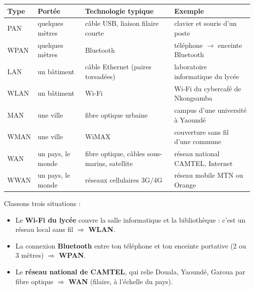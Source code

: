 \documentclass[11pt]{article}
\begin{document}
\begin{center}
\begin{tabularx}{\linewidth}{|l|l|X|X|}
\hline
\rowcolor{popblueL} \textbf{Type} & \textbf{Portée} & \textbf{Technologie typique} & \textbf{Exemple} \\
\hline
PAN & quelques mètres & câble USB, liaison filaire courte & clavier et souris d'un poste \\
\hline
WPAN & quelques mètres & Bluetooth & téléphone $\to$ enceinte Bluetooth \\
\hline
LAN & un bâtiment & câble Ethernet (paires torsadées) & laboratoire informatique du lycée \\
\hline
WLAN & un bâtiment & Wi-Fi & Wi-Fi du cybercafé de Nkongsamba \\
\hline
MAN & une ville & fibre optique urbaine & campus d'une université à Yaoundé \\
\hline
WMAN & une ville & WiMAX & couverture sans fil d'une commune \\
\hline
WAN & un pays, le monde & fibre optique, câbles sous-marins, satellite & réseau national CAMTEL, Internet \\
\hline
WWAN & un pays, le monde & réseaux cellulaires 3G/4G & réseau mobile MTN ou Orange \\
\hline
\end{tabularx}
\end{center}

\begin{exemplebox}
Classons trois situations :
\begin{itemize}
\item Le \textbf{Wi-Fi du lycée} couvre la salle informatique et la bibliothèque : c'est un réseau local sans fil $\Rightarrow$ \textbf{WLAN}.
\item La connexion \textbf{Bluetooth} entre ton téléphone et ton enceinte portative (2 ou 3 mètres) $\Rightarrow$ \textbf{WPAN}.
\item Le \textbf{réseau national de CAMTEL}, qui relie Douala, Yaoundé, Garoua par fibre optique $\Rightarrow$ \textbf{WAN} (filaire, à l'échelle du pays).
\end{itemize}
\end{exemplebox}
\end{document}
